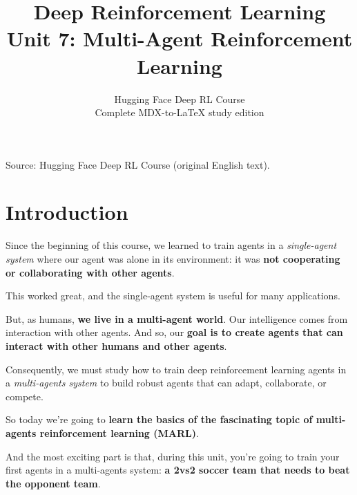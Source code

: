 \documentclass[11pt,a4paper]{article}
\title{\textbf{Deep Reinforcement Learning}\\[0.35em]\large Unit 7: Multi-Agent Reinforcement Learning}
\author{Hugging Face Deep RL Course\\\small Complete MDX-to-\LaTeX{} study edition}
\date{}
\begin{document}
\maketitle
\vspace{-0.8em}
\begin{center}\small\color{secondary}Source: Hugging Face Deep RL Course (original English text).\end{center}
\begingroup\small\setlength{\parskip}{0pt}\tableofcontents\endgroup
\vspace{0.5em}
\clearpage

\section{Introduction}\label{introduction}


Since the beginning of this course, we learned to train agents in a \emph{single-agent system} where our agent was alone in its environment: it was \textbf{not cooperating or collaborating with other agents}.

This worked great, and the single-agent system is useful for many applications.


But, as humans, \textbf{we live in a multi-agent world}. Our intelligence comes from interaction with other agents. And so, our \textbf{goal is to create agents that can interact with other humans and other agents}.

Consequently, we must study how to train deep reinforcement learning agents in a \emph{multi-agents system} to build robust agents that can adapt, collaborate, or compete.

So today we're going to \textbf{learn the basics of the fascinating topic of multi-agents reinforcement learning (MARL)}.

And the most exciting part is that, during this unit, you're going to train your first agents in a multi-agents system: \textbf{a 2vs2 soccer team that needs to beat the opponent team}.
\end{document}
